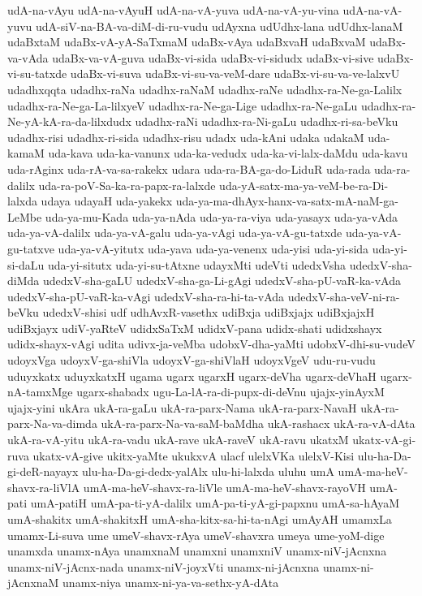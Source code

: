 {udA-na-vAyu
udA-na-vAyuH
udA-na-vA-yuva
udA-na-vA-yu-vina
udA-na-vA-yuvu
udA-siV-na-BA-va-diM-di-ru-vudu
udAyxna
udUdhx-lana
udUdhx-lanaM
udaBxtaM
udaBx-vA-yA-SaTxmaM
udaBx-vAya
udaBxvaH
udaBxvaM
udaBx-va-vAda
udaBx-va-vA-guva
udaBx-vi-sida
udaBx-vi-sidudx
udaBx-vi-sive
udaBx-vi-su-tatxde
udaBx-vi-suva
udaBx-vi-su-va-veM-dare
udaBx-vi-su-va-ve-lalxvU
udadhxqqta
udadhx-raNa
udadhx-raNaM
udadhx-raNe
udadhx-ra-Ne-ga-Lalilx
udadhx-ra-Ne-ga-La-lilxyeV
udadhx-ra-Ne-ga-Lige
udadhx-ra-Ne-gaLu
udadhx-ra-Ne-yA-kA-ra-da-lilxdudx
udadhx-raNi
udadhx-ra-Ni-gaLu
udadhx-ri-sa-beVku
udadhx-risi
udadhx-ri-sida
udadhx-risu
udadx
uda-kAni
udaka
udakaM
uda-kamaM
uda-kava
uda-ka-vanunx
uda-ka-vedudx
uda-ka-vi-lalx-daMdu
uda-kavu
uda-rAginx
uda-rA-va-sa-rakekx
udara
uda-ra-BA-ga-do-LiduR
uda-rada
uda-ra-dalilx
uda-ra-poV-Sa-ka-ra-papx-ra-lalxde
uda-yA-satx-ma-ya-veM-be-ra-Di-lalxda
udaya
udayaH
uda-yakekx
uda-ya-ma-dhAyx-hanx-va-satx-mA-naM-ga-LeMbe
uda-ya-mu-Kada
uda-ya-nAda
uda-ya-ra-viya
uda-yasayx
uda-ya-vAda
uda-ya-vA-dalilx
uda-ya-vA-galu
uda-ya-vAgi
uda-ya-vA-gu-tatxde
uda-ya-vA-gu-tatxve
uda-ya-vA-yitutx
uda-yava
uda-ya-venenx
uda-yisi
uda-yi-sida
uda-yi-si-daLu
uda-yi-situtx
uda-yi-su-tAtxne
udayxMti
udeVti
udedxVsha
udedxV-sha-diMda
udedxV-sha-gaLU
udedxV-sha-ga-Li-gAgi
udedxV-sha-pU-vaR-ka-vAda
udedxV-sha-pU-vaR-ka-vAgi
udedxV-sha-ra-hi-ta-vAda
udedxV-sha-veV-ni-ra-beVku
udedxV-shisi
udf
udhAvxR-vasethx
udiBxja
udiBxjajx
udiBxjajxH
udiBxjayx
udiV-yaRteV
udidxSaTxM
udidxV-pana
udidx-shati
udidxshayx
udidx-shayx-vAgi
udita
udivx-ja-veMba
udobxV-dha-yaMti
udobxV-dhi-su-vudeV
udoyxVga
udoyxV-ga-shiVla
udoyxV-ga-shiVlaH
udoyxVgeV
udu-ru-vudu
uduyxkatx
uduyxkatxH
ugama
ugarx
ugarxH
ugarx-deVha
ugarx-deVhaH
ugarx-nA-tamxMge
ugarx-shabadx
ugu-La-lA-ra-di-pupx-di-deVnu
ujajx-yinAyxM
ujajx-yini
ukAra
ukA-ra-gaLu
ukA-ra-parx-Nama
ukA-ra-parx-NavaH
ukA-ra-parx-Na-va-dimda
ukA-ra-parx-Na-va-saM-baMdha
ukA-rashacx
ukA-ra-vA-dAta
ukA-ra-vA-yitu
ukA-ra-vadu
ukA-rave
ukA-raveV
ukA-ravu
ukatxM
ukatx-vA-gi-ruva
ukatx-vA-give
ukitx-yaMte
ukukxvA
ulacf
ulelxVKa
ulelxV-Kisi
ulu-ha-Da-gi-deR-nayayx
ulu-ha-Da-gi-dedx-yalAlx
ulu-hi-lalxda
uluhu
umA
umA-ma-heV-shavx-ra-liVlA
umA-ma-heV-shavx-ra-liVle
umA-ma-heV-shavx-rayoVH
umA-pati
umA-patiH
umA-pa-ti-yA-dalilx
umA-pa-ti-yA-gi-papxnu
umA-sa-hAyaM
umA-shakitx
umA-shakitxH
umA-sha-kitx-sa-hi-ta-nAgi
umAyAH
umamxLa
umamx-Li-suva
ume
umeV-shavx-rAya
umeV-shavxra
umeya
ume-yoM-dige
unamxda
unamx-nAya
unamxnaM
unamxni
unamxniV
unamx-niV-jAcnxna
unamx-niV-jAcnx-nada
unamx-niV-joyxVti
unamx-ni-jAcnxna
unamx-ni-jAcnxnaM
unamx-niya
unamx-ni-ya-va-sethx-yA-dAta
}
